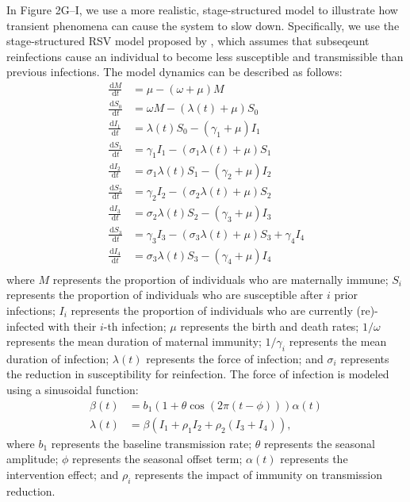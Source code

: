 \documentclass[12pt]{article}
\newcommand{\dd}[1]{\ensuremath{\, \mathrm{d}#1}}
\begin{document}
In Figure 2G--I, we use a more realistic, stage-structured model to illustrate how transient phenomena can cause the system to slow down.
Specifically, we use the stage-structured RSV model proposed by \citep{pitzer2015environmental}, which assumes that subseqeunt reinfections cause an individual to become less susceptible and transmissible than previous infections.
The model dynamics can be described as follows:
\begin{align}
\frac{\dd M}{\dd t} &= \mu - (\omega + \mu) M\\
\frac{\dd S_0}{\dd t} &= \omega M - (\lambda(t) + \mu) S_0\\
\frac{\dd I_1}{\dd t} &= \lambda(t) S_0 - (\gamma_1 + \mu) I_1\\
\frac{\dd S_1}{\dd t} &= \gamma_1 I_1 - (\sigma_1 \lambda(t) + \mu) S_1\\
\frac{\dd I_2}{\dd t} &= \sigma_1 \lambda(t) S_1 - (\gamma_2 + \mu) I_2\\
\frac{\dd S_2}{\dd t} &= \gamma_2 I_2 - (\sigma_2 \lambda(t) + \mu) S_2\\
\frac{\dd I_3}{\dd t} &= \sigma_2 \lambda(t) S_2 - (\gamma_3 + \mu) I_3\\
\frac{\dd S_3}{\dd t} &= \gamma_3 I_3 - (\sigma_3 \lambda(t) + \mu) S_3 + \gamma_4 I_4\\
\frac{\dd I_4}{\dd t} &= \sigma_3 \lambda(t) S_3 - (\gamma_4 + \mu) I_4\\
\end{align}
where $M$ represents the proportion of individuals who are maternally immune;
$S_i$ represents the proportion of individuals who are susceptible after $i$ prior infections;
$I_i$ represents the proportion of individuals who are currently (re)-infected with their $i$-th infection;
$\mu$ represents the birth and death rates;
$1/\omega$ represents the mean duration of maternal immunity;
$1/\gamma_i$ represents the mean duration of infection;
$\lambda(t)$ represents the force of infection;
and $\sigma_i$ represents the reduction in susceptibility for reinfection.
The force of infection is modeled using a sinusoidal function:
\begin{align}
\beta(t) &= b_1 (1 + \theta \cos(2 \pi (t-\phi))) \alpha(t)\\
\lambda(t) &= \beta (I_1 + \rho_1 I_2 + \rho_2 (I_3 + I_4)), 
\end{align}
where $b_1$ represents the baseline transmission rate; $\theta$ represents the seasonal amplitude; $\phi$ represents the seasonal offset term; $\alpha(t)$ represents the intervention effect; and $\rho_i$ represents the impact of immunity on transmission reduction.
\end{document}
